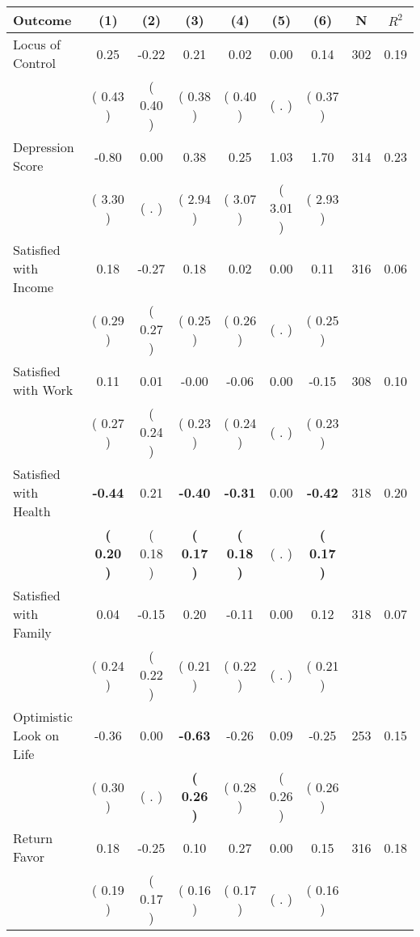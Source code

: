 \begin{tabular}{lcccccccc}
\toprule
 \textbf{Outcome} & \textbf{(1)} & \textbf{(2)} & \textbf{(3)} & \textbf{(4)} & \textbf{(5)} & \textbf{(6)} & \textbf{N} & \textbf{$ R^2$} \\
\midrule
Locus of Control &      0.25 &     -0.22 &      0.21 &      0.02 &      0.00 &      0.14 & 302 &       0.19 \\ 
 & (     0.43 ) & (     0.40 ) & (     0.38 ) & (     0.40 ) & (        . ) & (     0.37 ) & \\
Depression Score &     -0.80 &      0.00 &      0.38 &      0.25 &      1.03 &      1.70 & 314 &       0.23 \\ 
 & (     3.30 ) & (        . ) & (     2.94 ) & (     3.07 ) & (     3.01 ) & (     2.93 ) & \\
Satisfied with Income &      0.18 &     -0.27 &      0.18 &      0.02 &      0.00 &      0.11 & 316 &       0.06 \\ 
 & (     0.29 ) & (     0.27 ) & (     0.25 ) & (     0.26 ) & (        . ) & (     0.25 ) & \\
Satisfied with Work &      0.11 &      0.01 &     -0.00 &     -0.06 &      0.00 &     -0.15 & 308 &       0.10 \\ 
 & (     0.27 ) & (     0.24 ) & (     0.23 ) & (     0.24 ) & (        . ) & (     0.23 ) & \\
Satisfied with Health & \textbf{    -0.44} &      0.21 & \textbf{    -0.40} & \textbf{    -0.31} &      0.00 & \textbf{    -0.42} & 318 &       0.20 \\ 
 & \textbf{(     0.20 )} & (     0.18 ) & \textbf{(     0.17 )} & \textbf{(     0.18 )} & (        . ) & \textbf{(     0.17 )} & \\
Satisfied with Family &      0.04 &     -0.15 &      0.20 &     -0.11 &      0.00 &      0.12 & 318 &       0.07 \\ 
 & (     0.24 ) & (     0.22 ) & (     0.21 ) & (     0.22 ) & (        . ) & (     0.21 ) & \\
Optimistic Look on Life &     -0.36 &      0.00 & \textbf{    -0.63} &     -0.26 &      0.09 &     -0.25 & 253 &       0.15 \\ 
 & (     0.30 ) & (        . ) & \textbf{(     0.26 )} & (     0.28 ) & (     0.26 ) & (     0.26 ) & \\
Return Favor &      0.18 &     -0.25 &      0.10 &      0.27 &      0.00 &      0.15 & 316 &       0.18 \\ 
 & (     0.19 ) & (     0.17 ) & (     0.16 ) & (     0.17 ) & (        . ) & (     0.16 ) & \\

\end{tabular}
